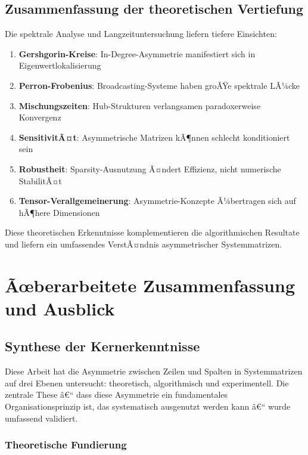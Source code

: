 ﻿\documentclass[a4paper,12pt]{report}
\theoremstyle{definition}
\begin{document}
	\section{Zusammenfassung der theoretischen Vertiefung}
	
	Die spektrale Analyse und Langzeituntersuchung liefern tiefere Einsichten:
	
	\begin{enumerate}
		\item \textbf{Gershgorin-Kreise}: In-Degree-Asymmetrie manifestiert sich in Eigenwertlokalisierung
		\item \textbf{Perron-Frobenius}: Broadcasting-Systeme haben groÃŸe spektrale LÃ¼cke
		\item \textbf{Mischungszeiten}: Hub-Strukturen verlangsamen paradoxerweise Konvergenz
		\item \textbf{SensitivitÃ¤t}: Asymmetrische Matrizen kÃ¶nnen schlecht konditioniert sein
		\item \textbf{Robustheit}: Sparsity-Ausnutzung Ã¤ndert Effizienz, nicht numerische StabilitÃ¤t
		\item \textbf{Tensor-Verallgemeinerung}: Asymmetrie-Konzepte Ã¼bertragen sich auf hÃ¶here Dimensionen
	\end{enumerate}
	
	Diese theoretischen Erkenntnisse komplementieren die algorithmischen Resultate und liefern ein umfassendes VerstÃ¤ndnis asymmetrischer Systemmatrizen.
	
	\chapter{Ãœberarbeitete Zusammenfassung und Ausblick}
	
	\section{Synthese der Kernerkenntnisse}
	
	Diese Arbeit hat die Asymmetrie zwischen Zeilen und Spalten in Systemmatrizen auf drei Ebenen untersucht: theoretisch, algorithmisch und experimentell. Die zentrale These â€“ dass diese Asymmetrie ein fundamentales Organisationsprinzip ist, das systematisch ausgenutzt werden kann â€“ wurde umfassend validiert.
	
	\subsection{Theoretische Fundierung}
	
\end{document}
